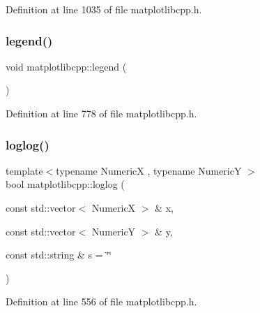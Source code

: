 Definition at line 1035 of file matplotlibcpp.\+h.

\mbox{\label{namespacematplotlibcpp_a916bb5a9dc5f6a24877cc027bf4ee624}} 
\subsubsection{\texorpdfstring{legend()}{legend()}}
{\footnotesize\ttfamily void matplotlibcpp\+::legend (\begin{DoxyParamCaption}{ }\end{DoxyParamCaption})\hspace{0.3cm}{\ttfamily [inline]}}



Definition at line 778 of file matplotlibcpp.\+h.

\mbox{\label{namespacematplotlibcpp_a6cfa8cba00f52a2c4614fa7a8a0bcd2b}} 
\subsubsection{\texorpdfstring{loglog()}{loglog()}}
{\footnotesize\ttfamily template$<$typename NumericX , typename NumericY $>$ \\
bool matplotlibcpp\+::loglog (\begin{DoxyParamCaption}\item[{const std\+::vector$<$ NumericX $>$ \&}]{x,  }\item[{const std\+::vector$<$ NumericY $>$ \&}]{y,  }\item[{const std\+::string \&}]{s = {\ttfamily \char`\"{}\char`\"{}} }\end{DoxyParamCaption})}



Definition at line 556 of file matplotlibcpp.\+h.

\mbox{\label{namespacematplotlibcpp_a2851ef02b92b32ee7d3dd8f8fd065ae3}} 
